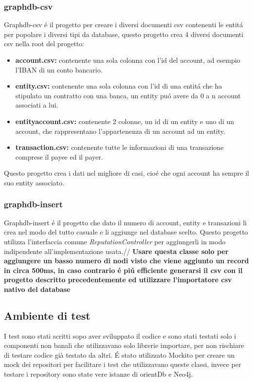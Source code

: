 \subsubsection{graphdb-csv}
Graphdb-csv \'e il progetto per creare i diversi documenti csv contenenti le entit\'a per popolare i diversi tipi da database, questo progetto crea 4 diversi documenti csv nella root del progetto:
\begin{itemize}
\item{\textbf{account.csv:}} contenente una sola colonna con l'id del account, ad esempio l'IBAN di un conto bancario.
\item{\textbf{entity.csv:}} contenente una sola colonna con l'id di una entit\'a che ha stipulato un contratto con una banca, un entity pu\'o avere da 0 a n account associati a lui.
\item{\textbf{entity\textunderscore account.csv:}} contenente 2 colonne, un id di un entity e uno di un account, che rappresentano l'appartenenza di un account ad un entity.
\item{\textbf{transaction.csv:}} contenente tutte le informazioni di una transazione comprese il payee ed il payer.
\end{itemize}
Questo progetto crea i dati nel migliore di casi, cio\'e che ogni account ha sempre il suo entity associato.


\subsubsection{graphdb-insert}
Graphdb-insert \'e il progetto che dato il numero di account, entity e transazioni li crea nel modo del tutto casuale e li aggiunge nel database scelto. Questo progetto utilizza l'interfaccia comune \textit{ReputationController} per aggiungerli in modo indipendente all'implementazione usata.//
\textbf{Usare questa classe solo per aggiungere un basso numero di nodi visto che viene aggiunto un record in circa 500ms, in caso contrario \'e pi\'u efficiente generarsi il csv con il progetto descritto precedentemente ed utilizzare l'importatore csv nativo del database}

\subsection{Ambiente di test}
I test sono stati scritti sopo aver sviluppato il codice e sono stati testati solo i componenti non banali che utilizzavano solo librerie importare, per non rischiare di testare codice già testato da altri. \'E stato utilizzato Mockito per creare un mock dei repositori per facilitare i test che utilizzavano queste classi, invece per testare i repository sono state vere istanze di orientDb e Neo4j.
